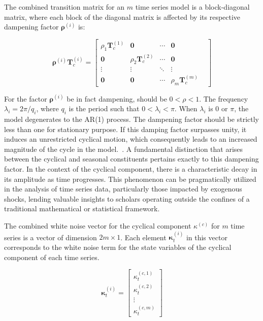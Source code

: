     The combined transition matrix for an $m$ time series model is a block-diagonal matrix,
    where each block of the diagonal matrix is affected by its respective dampening factor $\bm{\rho}^{(i)}$ is:

    \begin{equation}
        \bm{\rho}^{(i)} \bm{T}_c^{(i)} =
        \left[
            \begin{array}{ccccc}
                \rho_1 \bm{T}_c^{(1)} & \mathbf{0} & \cdots & \mathbf{0} \\
                \mathbf{0} & \rho_2 \bm{T}_c^{(2)} & \cdots & \mathbf{0} & \\
                \vdots & \vdots & \ddots & \vdots & \\
                \mathbf{0} & \mathbf{0} & \cdots & \rho_m \bm{T}_c^{(m)}
            \end{array}
        \right]
        \label{eq:cyclical_transition_mv}
    \end{equation}

    For the factor $\bm{\rho}^{(i)}$ be in fact dampening, should be $ 0 < \rho < 1$.
    The frequency $\lambda_i = 2\pi/q_i $, where $q_i$ is the period such that $0 < \lambda_i < \pi$.
    When $\lambda_i$ is 0 or $\pi$, the model degenerates to the AR(1) process.
    The dampening factor should be strictly less than one for stationary purpose.
    If this damping factor surpasses unity, it induces an unrestricted cyclical motion,
    which consequently leads to an increased magnitude of the cycle in the model.~\cite{qiu_multivariate_2018}.
    A fundamental distinction that arises between the cyclical and seasonal constituents pertains exactly to this dampening factor.
    In the context of the cyclical component, there is a characteristic decay in its amplitude as time progresses.
    This phenomenon can be pragmatically utilized in the analysis of time series data,
    particularly those impacted by exogenous shocks,
    lending valuable insights to scholars operating outside the confines of a traditional mathematical or statistical framework.


    The combined white noise vector for the cyclical component $\kappa^{(c)}$ for $m$ time series is a vector of dimension $2m \times 1$.
    Each element $\bm{\kappa}_{t}^{(i)}$ in this vector corresponds to the white noise term for the state variables of the cyclical component of each time series.

    \begin{equation}
        \bm{\kappa}_{t}^{(i)}=
            \left[
                \begin{array}{c}
                    \kappa_{t}^{(c,1)} \\
                    \kappa_{t}^{(c,2)} \\
                    \vdots \\
                    \kappa_{t}^{(c,m)}
                \end{array}
            \right]
        \label{eq:cyclical_error_mv}
    \end{equation}

